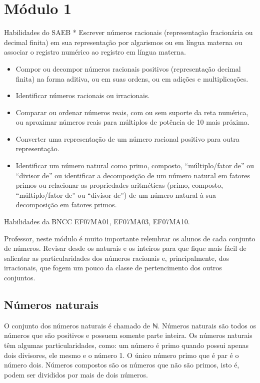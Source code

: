 \chapter{Módulo 1}

Habilidades do SAEB * Escrever números racionais (representação
fracionária ou decimal finita) em sua representação por algarismos ou em
língua materna ou associar o registro numérico ao registro em língua
materna.

\begin{itemize}
\item
  Compor ou decompor números racionais positivos (representação decimal
  finita) na forma aditiva, ou em suas ordens, ou em adições e
  multiplicações.
\item
  Identificar números racionais ou irracionais.
\item
  Comparar ou ordenar números reais, com ou sem suporte da reta
  numérica, ou aproximar números reais para múltiplos de potência de 10
  mais próxima.
\item
  Converter uma representação de um número racional positivo para outra
  representação.
\item
  Identificar um número natural como primo, composto, ``múltiplo/fator
  de'' ou ``divisor de'' ou identificar a decomposição de um número
  natural em fatores primos ou relacionar as propriedades aritméticas
  (primo, composto, ``múltiplo/fator de'' ou ``divisor de'') de um
  número natural à sua decomposição em fatores primos.
\end{itemize}

Habilidades da BNCC EF07MA01, EF07MA03, EF07MA10.

Professor, neste módulo é muito importante relembrar os alunos de cada
conjunto de números. Revisar desde os naturais e os inteiros para que
fique mais fácil de salientar as particularidades dos números racionais
e, principalmente, dos irracionais, que fogem um pouco da classe de
pertencimento dos outros conjuntos.~

\section{Números naturais}

O conjunto dos números naturais é chamado de ℕ. Números naturais são
todos os números que são positivos e possuem somente parte inteira. Os
números naturais têm algumas particularidades, como: um número é primo
quando possui apenas dois divisores, ele mesmo e o número 1. O único
número primo que é par é o número dois. Números compostos são os números
que não são primos, isto é, podem ser divididos por mais de dois
números.~

